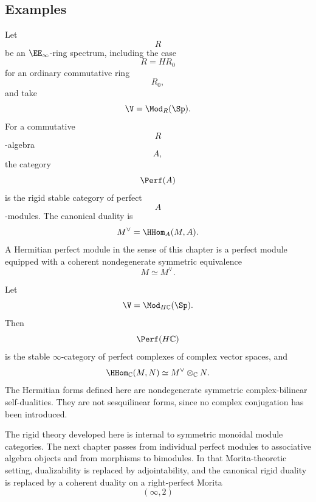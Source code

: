 \subsection{Examples}

\begin{example}
\label{ex:perfect-complexes}
Let
\[
    R
\]
be an $\EE_\infty$-ring spectrum, including the case
\[
    R=HR_0
\]
for an ordinary commutative ring
\[
    R_0,
\]
and take
\[
    \V
    =
    \Mod_R(\Sp).
\]
For a commutative
\[
    R
\]
-algebra
\[
    A,
\]
the category
\[
    \Perf(A)
\]
is the rigid stable category of perfect
\[
    A
\]
-modules. The canonical duality is
\[
    M^\vee
    =
    \HHom_A(M,A).
\]
A Hermitian perfect module in the sense of this chapter is a perfect
module equipped with a coherent nondegenerate symmetric equivalence
\[
    M
    \simeq
    M^\vee.
\]
\end{example}

\begin{example}
\label{ex:complex-perfect-complexes}
Let
\[
    \V
    =
    \Mod_{H\mathbb C}(\Sp).
\]
Then
\[
    \Perf(H\mathbb C)
\]
is the stable $\infty$-category of perfect complexes of complex vector
spaces, and
\[
    \HHom_{\mathbb C}(M,N)
    \simeq
    M^\vee\otimes_{\mathbb C}N.
\]
The Hermitian forms defined here are nondegenerate symmetric
complex-bilinear self-dualities. They are not sesquilinear forms, since no
complex conjugation has been introduced.
\end{example}

The rigid theory developed here is internal to symmetric monoidal module
categories. The next chapter passes from individual perfect modules to
associative algebra objects and from morphisms to bimodules. In that
Morita-theoretic setting, dualizability is replaced by adjointability, and
the canonical rigid duality is replaced by a coherent duality on a
right-perfect Morita
\[
    (\infty,2)
\]
